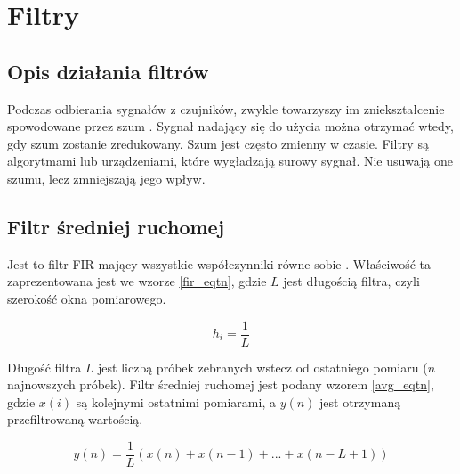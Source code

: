 {{        
    }

    \label{filters}
    \newpage
    \section{Filtry}
    {
    \subsection{Opis działania filtrów}
    {
        Podczas odbierania sygnałów z czujników, zwykle towarzyszy im zniekształcenie spowodowane przez szum \cite{filters}. Sygnał nadający się do użycia można otrzymać wtedy, gdy szum zostanie zredukowany. Szum jest często zmienny w czasie. Filtry są algorytmami lub urządzeniami, które wygładzają surowy sygnał. Nie usuwają one szumu, lecz zmniejszają jego wpływ. 
    }
    \label{avg_filter}
    \subsection{Filtr średniej ruchomej}
    {
        Jest to filtr FIR mający wszystkie współczynniki równe sobie \cite{filters}. Właściwość ta zaprezentowana jest we wzorze \ref{fir_eqtn}, gdzie $L$ jest długością filtra, czyli szerokość okna pomiarowego.
        
        \begin{equation}\label{fir_eqtn}
            h_i=\frac{1}{L}
        \end{equation}
        
        Długość filtra $L$ jest liczbą próbek zebranych wstecz od ostatniego pomiaru ($n$ najnowszych próbek). Filtr średniej ruchomej jest podany wzorem \ref{avg_eqtn}, gdzie $x(i)$ są kolejnymi ostatnimi pomiarami, a $y(n)$ jest otrzymaną przefiltrowaną wartością.
        
        \begin{equation}\label{avg_eqtn}
            y(n) = \frac{1}{L} (x(n) + x(n-1) + ... + x(n - L + 1))
        \end{equation}    
    }
    \label{kalman_one_dim}
}}
